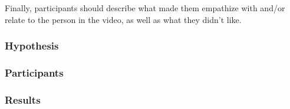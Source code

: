 Finally, participants should describe what made them empathize with and/or relate to the person in the video, as well as what they didn't like.

\subsubsection{Hypothesis}

\subsubsection{Participants}

\subsubsection{Results}
